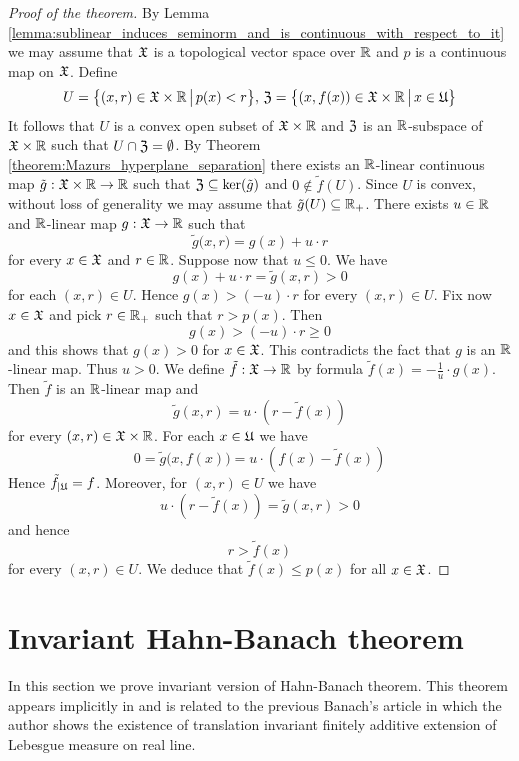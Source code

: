 \begin{proof}[Proof of the theorem]
By Lemma \ref{lemma:sublinear_induces_seminorm_and_is_continuous_with_respect_to_it} we may assume that ${\mathfrak X}$ is a topological vector space over ${\mathbb R}$ and $p$ is a continuous map on ${\mathfrak X}$. Define
$$U = \big\{(x,r)\in {\mathfrak X}\times {\mathbb R}\,\big|\,p(x) < r\big\},\,{\mathfrak Z} = \big\{(x,f(x))\in {\mathfrak X}\times {\mathbb R}\,\big|\,x\in {\mathfrak U}\big\}$$ 
It follows that $U$ is a convex open subset of ${\mathfrak X}\times {\mathbb R}$ and ${\mathfrak Z}$ is an ${\mathbb R}$-subspace of ${\mathfrak X}\times {\mathbb R}$ such that $U \cap {\mathfrak Z} = \emptyset$. By Theorem \ref{theorem:Mazurs_hyperplane_separation} there exists an ${\mathbb R}$-linear continuous map $\tilde{g}:{\mathfrak X}\times {\mathbb R}\rightarrow {\mathbb R}$ such that ${\mathfrak Z}\subseteq \ker(\tilde{g})$ and $0 \not \in \tilde{f}(U)$. Since $U$ is convex, without loss of generality we may assume that $\tilde{g}(U)\subseteq {\mathbb R}_+$. There exists $u \in {\mathbb R}$ and ${\mathbb R}$-linear map $g:{\mathfrak X}\rightarrow {\mathbb R}$ such that 
$$\tilde{g}\big(x, r\big) = g(x) + u\cdot r$$
for every $x \in {\mathfrak X}$ and $r \in {\mathbb R}$. Suppose now that $u \leq 0$. We have
$$g(x) + u\cdot r = \tilde{g}(x,r) > 0$$
for each $(x,r) \in U$. Hence $g(x) > (- u) \cdot r$ for every $(x,r) \in U$. Fix now $x\in {\mathfrak X}$ and pick $r \in {\mathbb R}_+$ such that $r > p(x)$. Then 
$$g(x) > (-u)\cdot r \geq 0$$ 
and this shows that $g(x) > 0$ for $x\in {\mathfrak X}$. This contradicts the fact that $g$ is an ${\mathbb R}$-linear map. Thus $u > 0$. We define $\tilde{f}:{\mathfrak X}\rightarrow {\mathbb R}$ by formula $\tilde{f}(x) = -\frac{1}{u}\cdot g(x)$. Then $\tilde{f}$ is an ${\mathbb R}$-linear map and $$\tilde{g}(x, r) = u \cdot \left(r - \tilde{f}(x)\right)$$
for every $(x,r) \in {\mathfrak X}\times {\mathbb R}$. For each $x \in {\mathfrak U}$ we have
$$0 = \tilde{g}\big(x,f(x)\big) = u \cdot \left(f(x) - \tilde{f}(x)\right)$$
Hence $\tilde{f}_{\mid {\mathfrak U}} = f$. Moreover, for $(x,r) \in U$ we have 
$$u\cdot \left(r - \tilde{f}(x)\right) = \tilde{g}(x, r) > 0$$
and hence
$$r > \tilde{f}(x)$$
for every $(x,r)\in U$. We deduce that $\tilde{f}(x) \leq p(x)$ for all $x\in {\mathfrak X}$. 
\end{proof}


\section{Invariant Hahn-Banach theorem}
\noindent
In this section we prove invariant version of Hahn-Banach theorem. This theorem appears implicitly in \cite[Chapitre II, \S3]{banach1979theorieoperationslineaires} and is related to the previous Banach's article \cite{banach1923problemelameasure} in which the author shows the existence of translation invariant finitely additive extension of Lebesgue measure on real line.

